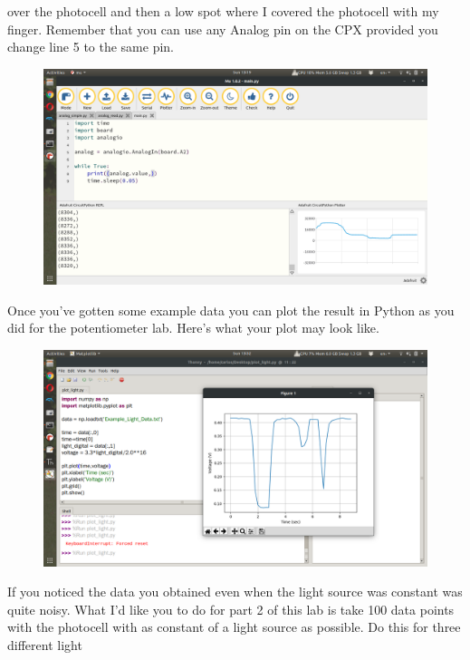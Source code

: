 over the photocell and then a low spot where I covered the photocell
with my finger. Remember that you can use any Analog pin on the CPX
provided you change line 5 to the same pin. 
\begin{figure}[H]
  \begin{center}
    \includegraphics[width=\textwidth]{Figures/photocell_mu.png}
  \end{center}
\end{figure}
Once you’ve gotten some example data you can plot the result in Python as you did for the potentiometer lab. Here’s what your plot may look like.
\begin{figure}[H]
  \begin{center}
    \includegraphics[width=\textwidth]{Figures/photocell_plots.png}
  \end{center}
\end{figure}
If you noticed the data you obtained even when the light source was
constant was quite noisy. What I’d like you to do for part 2 of this
lab is take 100 data points with the photocell with as constant of a
light source as possible. Do this for three different light
